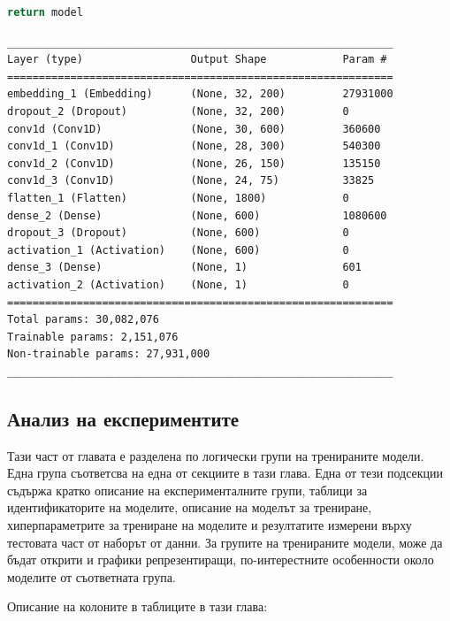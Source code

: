 \documentclass{article}
\begin{document}
\begin{itemize}
\begin{lstlisting}[language=Python, caption=Дефиниция на cnn-classifier-1.]
    return model
\end{lstlisting}

\begin{lstlisting}[numbers=none, caption=Обобщение на cnn-classifier-1.]
_____________________________________________________________
Layer (type)                 Output Shape            Param #
=============================================================
embedding_1 (Embedding)      (None, 32, 200)         27931000
dropout_2 (Dropout)          (None, 32, 200)         0
conv1d (Conv1D)              (None, 30, 600)         360600
conv1d_1 (Conv1D)            (None, 28, 300)         540300
conv1d_2 (Conv1D)            (None, 26, 150)         135150
conv1d_3 (Conv1D)            (None, 24, 75)          33825
flatten_1 (Flatten)          (None, 1800)            0
dense_2 (Dense)              (None, 600)             1080600
dropout_3 (Dropout)          (None, 600)             0
activation_1 (Activation)    (None, 600)             0
dense_3 (Dense)              (None, 1)               601
activation_2 (Activation)    (None, 1)               0
=============================================================
Total params: 30,082,076
Trainable params: 2,151,076
Non-trainable params: 27,931,000
_____________________________________________________________
\end{lstlisting}

\end{itemize}

\subsection{Анализ на експериментите}

Тази част от главата е разделена по логически групи на тренираните модели. Една група съответсва на една от секциите в
тази глава. Една от тези подсекции съдържа кратко описание на експерименталните групи, таблици за идентификаторите на
моделите, описание на моделът за трениране, хиперпараметрите за трениране на моделите и резултатите измерени върху
тестовата част от наборът от данни. За групите на тренираните модели, може да бъдат открити и графики репрезентиращи,
по-интерестните особенности около моделите от съответната група.

Описание на колоните в таблиците в тази глава:
\end{document}
